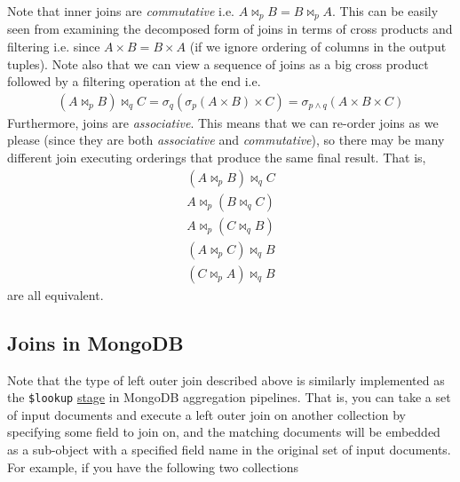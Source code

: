 \documentclass[10pt,a4paper]{article}
\begin{document}
Note that inner joins are \textit{commutative} i.e. $A \Join_p B = B \Join_p A$. This can be easily seen from examining the decomposed form of joins in terms of cross products and filtering i.e. since $A \times B = B \times A$ (if we ignore ordering of columns in the output tuples). Note also that we can view a sequence of joins as a big cross product followed by a filtering operation at the end i.e.
\begin{align*}
    (A \Join_p B) \Join_q C = \sigma_q(\sigma_p(A \times B) \times C) = \sigma_{p \wedge q}(A \times B \times C)
\end{align*}
Furthermore, joins are \textit{associative}. This means that we can re-order joins as we please (since they are both \textit{associative} and \textit{commutative}), so there may be many different join executing orderings that produce the same final result. That is,
\begin{align*}
    (A \Join_p B) \Join_q C \\ 
    A \Join_p (B \Join_q C) \\
    A \Join_p (C \Join_q B) \\
    (A \Join_p C) \Join_q B \\
    (C \Join_p A) \Join_q B
\end{align*}
are all equivalent. 

\subsection*{Joins in MongoDB}

Note that the type of left outer join described above is similarly implemented as the \texttt{\$lookup} \href{https://www.mongodb.com/docs/manual/reference/operator/aggregation/lookup/}{stage} in MongoDB aggregation pipelines. That is, you can take a set of input documents and execute a left outer join on another collection by specifying some field to join on, and the matching documents will be embedded as a sub-object with a specified field name in the original set of input documents. For example, if you have the following two collections
\end{document}
